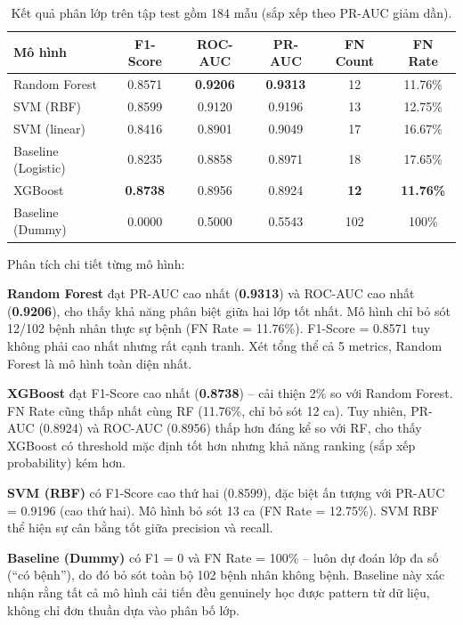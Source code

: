 \begin{table}[H]
\centering
\caption{Kết quả phân lớp trên tập test gồm 184 mẫu (sắp xếp theo PR-AUC giảm dần).}
\label{tab:classification_results}
\begin{tabular}{|l|c|c|c|c|c|}
\hline
\textbf{Mô hình} & \textbf{F1-Score} & \textbf{ROC-AUC} & \textbf{PR-AUC} & \textbf{FN Count} & \textbf{FN Rate} \\ \hline
Random Forest & 0.8571 & \textbf{0.9206} & \textbf{0.9313} & 12 & 11.76\% \\ \hline
SVM (RBF) & 0.8599 & 0.9120 & 0.9196 & 13 & 12.75\% \\ \hline
SVM (linear) & 0.8416 & 0.8901 & 0.9049 & 17 & 16.67\% \\ \hline
Baseline (Logistic) & 0.8235 & 0.8858 & 0.8971 & 18 & 17.65\% \\ \hline
XGBoost & \textbf{0.8738} & 0.8956 & 0.8924 & \textbf{12} & \textbf{11.76\%} \\ \hline
Baseline (Dummy) & 0.0000 & 0.5000 & 0.5543 & 102 & 100\% \\ \hline
\end{tabular}
\end{table}

Phân tích chi tiết từng mô hình:

\textbf{Random Forest} đạt PR-AUC cao nhất (\textbf{0.9313}) và ROC-AUC cao nhất (\textbf{0.9206}), cho thấy khả năng phân biệt giữa hai lớp tốt nhất. Mô hình chỉ bỏ sót 12/102 bệnh nhân thực sự bệnh (FN Rate = 11.76\%). F1-Score = 0.8571 tuy không phải cao nhất nhưng rất cạnh tranh. Xét tổng thể cả 5 metrics, Random Forest là mô hình toàn diện nhất.

\textbf{XGBoost} đạt F1-Score cao nhất (\textbf{0.8738}) -- cải thiện 2\% so với Random Forest. FN Rate cũng thấp nhất cùng RF (11.76\%, chỉ bỏ sót 12 ca). Tuy nhiên, PR-AUC (0.8924) và ROC-AUC (0.8956) thấp hơn đáng kể so với RF, cho thấy XGBoost có threshold mặc định tốt hơn nhưng khả năng ranking (sắp xếp probability) kém hơn.

\textbf{SVM (RBF)} có F1-Score cao thứ hai (0.8599), đặc biệt ấn tượng với PR-AUC = 0.9196 (cao thứ hai). Mô hình bỏ sót 13 ca (FN Rate = 12.75\%). SVM RBF thể hiện sự cân bằng tốt giữa precision và recall.

\textbf{Baseline (Dummy)} có F1 = 0 và FN Rate = 100\% -- luôn dự đoán lớp đa số (``có bệnh''), do đó bỏ sót toàn bộ 102 bệnh nhân không bệnh. Baseline này xác nhận rằng tất cả mô hình cải tiến đều genuinely học được pattern từ dữ liệu, không chỉ đơn thuần dựa vào phân bố lớp.

